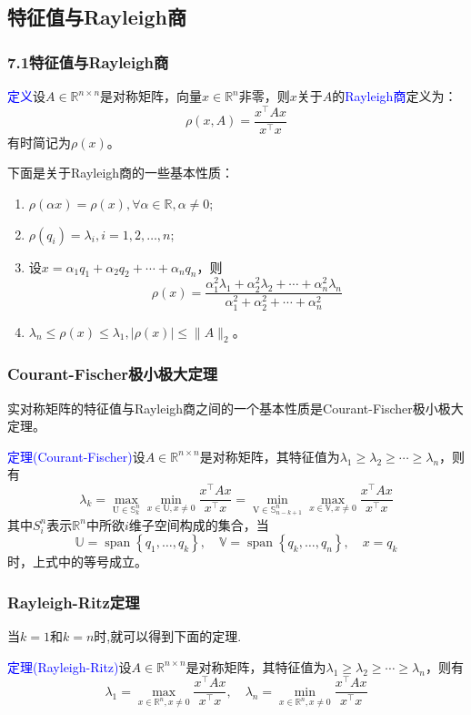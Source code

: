 \documentclass[notheorems,serif]{beamer}
\begin{document}
\subsection*{特征值与Rayleigh商}
\begin{frame}
\frametitle{7.1\qquad 特征值与Rayleigh商}



\textcolor{blue}{定义}\quad 设$A\in \mathbb{R}^{n\times n}$是对称矩阵，向量$x\in \mathbb{R}^n$非零，则$x$关于$A$的\textcolor{blue}{Rayleigh商}定义为：$$
\rho(x, A)=\frac{x^{\top} A x}{x^{\top} x}
$$
有时简记为$\rho(x)$。

下面是关于Rayleigh商的一些基本性质：
\begin{enumerate}[(1)]
	\item $\rho(\alpha x)=\rho(x), \forall \alpha \in \mathbb{R}, \alpha \neq 0$;
	\item $\rho\left(q_{i}\right)=\lambda_{i}, i=1,2, \dots, n$;
	\item 设$x=\alpha_{1} q_{1}+\alpha_{2} q_{2}+\cdots+\alpha_{n} q_{n}$，则$$
	\rho(x)=\frac{\alpha_{1}^{2} \lambda_{1}+\alpha_{2}^{2} \lambda_{2}+\cdots+\alpha_{n}^{2} \lambda_{n}}{\alpha_{1}^{2}+\alpha_{2}^{2}+\cdots+\alpha_{n}^{2}}
	$$
	\item $\lambda_{n} \leq \rho(x) \leq \lambda_{1},|\rho(x)| \leq\|A\|_{2}$。
\end{enumerate}
\end{frame}
\begin{frame}
\frametitle{Courant-Fischer极小极大定理}


实对称矩阵的特征值与Rayleigh商之间的一个基本性质是Courant-Fischer极小极大定理。

\textcolor{blue}{定理(Courant-Fischer)}\quad 设$A \in \mathbb{R}^{n \times n}$是对称矩阵，其特征值为$\lambda_{1} \geq \lambda_{2} \geq \cdots \geq \lambda_{n}$，则有$$
\lambda_{k}=\max _{\mathrm{U} \in \mathbb{S}_{k}^{n}} \min _{x \in \mathbb{U}, x \neq 0} \frac{x^{\top} A x}{x^{\top} x}
=\min _{\mathrm{V} \in \mathbb{S}_{n-k+1}^{n}} \max _{x \in \mathbb{V}, x \neq 0} \frac{x^{\top} A x}{x^{\top} x}
$$
其中$S_{i}^{n}$表示$\mathbb{R}^{n}$中所欲$i$维子空间构成的集合，当$$
\mathbb{U}=\operatorname{span}\left\{q_{1}, \ldots, q_{k}\right\}, \quad \mathbb{V}=\operatorname{span}\left\{q_{k}, \ldots, q_{n}\right\}, \quad x=q_{k}
$$时，上式中的等号成立。
\end{frame}
\begin{frame}
\frametitle{Rayleigh-Ritz定理}


当$k= 1$和$k=n$时,就可以得到下面的定理.

\textcolor{blue}{定理(Rayleigh-Ritz)}\quad 设$A \in \mathbb{R}^{n \times n}$是对称矩阵，其特征值为$\lambda_{1} \geq \lambda_{2} \geq \cdots \geq \lambda_{n}$，则有$$
\lambda_{1}=\max _{x \in \mathbb{R}^{n}, x \neq 0} \frac{x^{\top} A x}{x^{\top} x}, \quad \lambda_{n}=\min _{x \in \mathbb{R}^{n}, x \neq 0} \frac{x^{\top} A x}{x^{\top} x}
$$
\end{frame}
\end{document}
